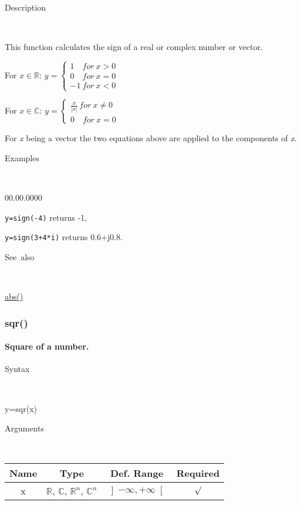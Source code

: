 \begin{description}
\item [Description]~
\end{description}
This function calculates the sign of a real or complex number or vector.

\medskip{}
For $x\in\mathbb{R}$: $y=\left\{ \begin{array}{l}
1\quad for\: x>0\\
0\quad for\: x=0\\
-1\: for\: x<0\end{array}\right.$ 
\medskip{}

For $x\in\mathbb{C}$: $y=\left\{ \begin{array}{l}
{\displaystyle \frac{x}{\left|x\right|}}\, for\: x\neq0\\
0\quad for\: x=0\end{array}\right.$
\medskip{}

\noindent For \textit{x} being a vector the two equations above are
applied to the components of \textit{x}.

\begin{description}
\item [Examples]~
\end{description}
\begin{lyxlist}{00.00.0000}
\item [\texttt{y=sign(-4)}]returns -1,
\item [\texttt{y=sign(3+4{*}i)}]returns 0.6+j0.8.
\end{lyxlist}
\begin{description}
\item [See~also]~
\end{description}
\textcolor{blue}{\hyperlink{abs}{abs()}}


\newpage
\subsubsection*{\hypertarget{sqr}{}{\Large sqr()}}


\paragraph{\label{par:Square}Square of a number.}

\begin{description}
\item [Syntax]~
\end{description}
y=sqr(x)

\begin{description}
\item [Arguments]~
\end{description}
\begin{tabular}{|c|c|c|c|}
\hline 
Name&
Type&
Def. Range&
Required\tabularnewline
\hline
\hline 
x&
$\mathbb{R}$, $\mathbb{C}$, $\mathbb{R}^{n}$, $\mathbb{C}^{n}$&
$\left]-\infty,+\infty\right[$&
$\surd$\tabularnewline
\hline
\end{tabular}

